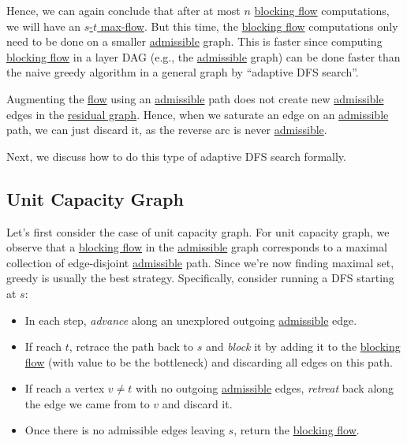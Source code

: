 Hence, we can again conclude that after at most \(n\) \hyperref[def:blocking-flow]{blocking flow} computations, we will have an \hyperref[prb:s-t-max-flow]{\(s\)-\(t\) max-flow}. But this time, the \hyperref[def:blocking-flow]{blocking flow} computations only need to be done on a smaller \hyperref[def:admissible]{admissible} graph. This is faster since computing \hyperref[def:blocking-flow]{blocking flow} in a layer DAG (e.g., the \hyperref[def:admissible]{admissible} graph) can be done faster than the naive greedy algorithm in a general graph by ``adaptive DFS search''.

\begin{intuition}
	Augmenting the \hyperref[def:flow]{flow} using an \hyperref[def:admissible]{admissible} path does not create new \hyperref[def:admissible]{admissible} edges in the \hyperref[def:residual-graph]{residual graph}. Hence, when we saturate an edge on an \hyperref[def:admissible]{admissible} path, we can just discard it, as the reverse arc is never \hyperref[def:admissible]{admissible}.
\end{intuition}

Next, we discuss how to do this type of adaptive DFS search formally.

\subsection{Unit Capacity Graph}
Let's first consider the case of unit capacity graph. For unit capacity graph, we observe that a \hyperref[def:blocking-flow]{blocking flow} in the \hyperref[def:admissible]{admissible} graph corresponds to a maximal collection of edge-disjoint \hyperref[def:admissible]{admissible} path. Since we're now finding maximal set, greedy is usually the best strategy. Specifically, consider running a DFS starting at \(s\):
\begin{itemize}
	\item In each step, \emph{advance} along an unexplored outgoing \hyperref[def:admissible]{admissible} edge.
	\item If reach \(t\), retrace the path back to \(s\) and \emph{block} it by adding it to the \hyperref[def:blocking-flow]{blocking flow} (with value to be the bottleneck) and discarding all edges on this path.
	\item If reach a vertex \(v \neq t\) with no outgoing \hyperref[def:admissible]{admissible} edges, \emph{retreat} back along the edge we came from to \(v\) and discard it.
	\item Once there is no admissible edges leaving \(s\), return the \hyperref[def:blocking-flow]{blocking flow}.
\end{itemize}

